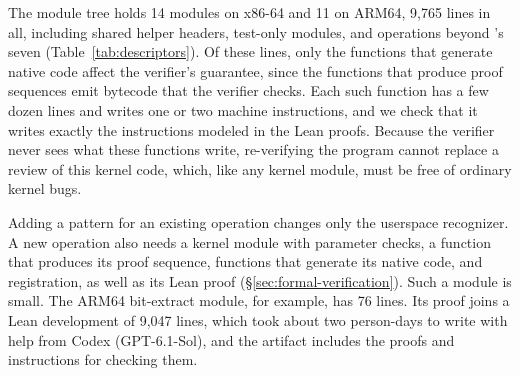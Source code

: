The module tree holds 14 modules on x86-64 and 11 on ARM64, 9{,}765 lines in all, including shared helper headers, test-only modules, and operations beyond \lang's seven (Table~\ref{tab:descriptors}).
Of these lines, only the functions that generate native code affect the verifier's guarantee, since the functions that produce proof sequences emit bytecode that the verifier checks.
Each such function has a few dozen lines and writes one or two machine instructions, and we check that it writes exactly the instructions modeled in the Lean proofs. Because the verifier never sees what these functions write, re-verifying the program cannot replace a review of this kernel code, which, like any kernel module, must be free of ordinary kernel bugs.

Adding a pattern for an existing operation changes only the userspace recognizer.
A new operation also needs a kernel module with parameter checks, a function that produces its proof sequence, functions that generate its native code, and registration, as well as its Lean proof (\S\ref{sec:formal-verification}). Such a module is small. The ARM64 bit-extract module, for example, has 76 lines.
Its proof joins a Lean development of 9{,}047 lines, which took about two person-days to write with help from Codex (GPT-6.1-Sol), and the artifact includes the proofs and instructions for checking them.
